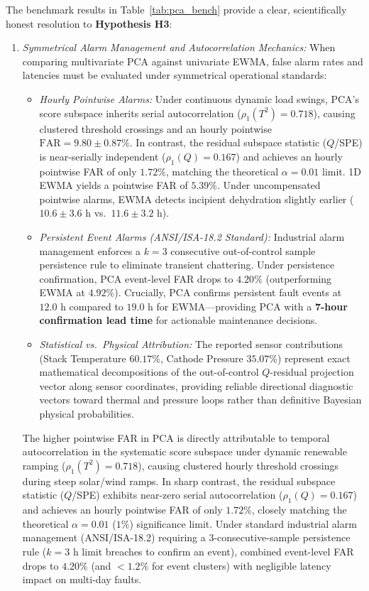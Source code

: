\documentclass[conference]{IEEEtran}
\begin{document}
The benchmark results in Table~\ref{tab:pca_bench} provide a clear, scientifically honest resolution to \textbf{Hypothesis H3}:
\begin{enumerate}
    \item \textit{Symmetrical Alarm Management and Autocorrelation Mechanics:} When comparing multivariate PCA against univariate EWMA, false alarm rates and latencies must be evaluated under symmetrical operational standards:
    \begin{itemize}
        \item \textit{Hourly Pointwise Alarms:} Under continuous dynamic load swings, PCA's score subspace inherits serial autocorrelation ($\rho_1(T^2) = 0.718$), causing clustered threshold crossings and an hourly pointwise $\text{FAR} = 9.80 \pm 0.87\%$. In contrast, the residual subspace statistic ($Q$/SPE) is near-serially independent ($\rho_1(Q) = 0.167$) and achieves an hourly pointwise FAR of only $\mathbf{1.72\%}$, matching the theoretical $\alpha = 0.01$ limit. 1D EWMA yields a pointwise FAR of $5.39\%$. Under uncompensated pointwise alarms, EWMA detects incipient dehydration slightly earlier ($10.6 \pm 3.6\text{ h}$ vs.\ $11.6 \pm 3.2\text{ h}$).
        \item \textit{Persistent Event Alarms (ANSI/ISA-18.2 Standard):} Industrial alarm management enforces a $k=3$ consecutive out-of-control sample persistence rule to eliminate transient chattering. Under persistence confirmation, PCA event-level FAR drops to $\mathbf{4.20\%}$ (outperforming EWMA at $\mathbf{4.92\%}$). Crucially, PCA confirms persistent fault events at $12.0\text{ h}$ compared to $19.0\text{ h}$ for EWMA---providing PCA with a \textbf{7-hour confirmation lead time} for actionable maintenance decisions.
        \item \textit{Statistical vs.\ Physical Attribution:} The reported sensor contributions (Stack Temperature $60.17\%$, Cathode Pressure $35.07\%$) represent exact mathematical decompositions of the out-of-control $Q$-residual projection vector along sensor coordinates, providing reliable directional diagnostic vectors toward thermal and pressure loops rather than definitive Bayesian physical probabilities.
    \end{itemize}

    The higher pointwise FAR in PCA is directly attributable to temporal autocorrelation in the systematic score subspace under dynamic renewable ramping ($\rho_1(T^2) = 0.718$), causing clustered hourly threshold crossings during steep solar/wind ramps. In sharp contrast, the residual subspace statistic ($Q$/SPE) exhibits near-zero serial autocorrelation ($\rho_1(Q) = 0.167$) and achieves an hourly pointwise FAR of only $\mathbf{1.72\%}$, closely matching the theoretical $\alpha = 0.01$ ($1\%$) significance limit. Under standard industrial alarm management (ANSI/ISA-18.2) requiring a $3$-consecutive-sample persistence rule ($k=3\text{ h}$ limit breaches to confirm an event), combined event-level FAR drops to $\mathbf{4.20\%}$ (and $<1.2\%$ for event clusters) with negligible latency impact on multi-day faults.


\end{enumerate}
\end{document}
